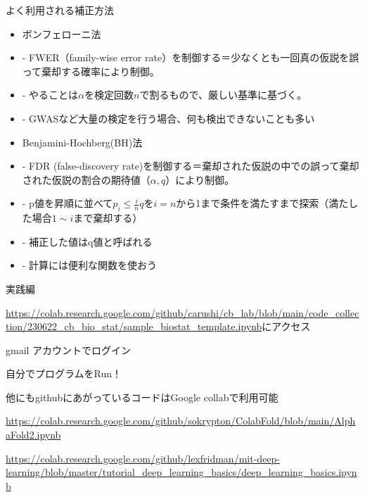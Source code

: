 \documentclass[cjk, aspectratio=169]{beamer}
\begin{document}
    \begin{frame}{よく利用される補正方法}
    \begin{itemize}
        \item ボンフェローニ法
        \item - FWER（family-wise error rate）を制御する＝少なくとも一回真の仮説を誤って棄却する確率により制御。
        \item - やることは$\alpha$を検定回数$n$で割るもので、厳しい基準に基づく。
        \item - GWASなど大量の検定を行う場合、何も検出できないことも多い
        \item Benjamini-Hochberg(BH)法
        \item - FDR (false-discovery rate)を制御する＝棄却された仮説の中での誤って棄却された仮説の割合の期待値（$\alpha,q$）により制御。
        \item - p値を昇順に並べて$p_i \le \frac{i}{n}q$を$i=n$から1まで条件を満たすまで探索（満たした場合$1 \sim i$まで棄却する）
        \item - 補正した値はq値と呼ばれる
        \item - 計算には便利な関数を使おう
    \end{itemize}
    \end{frame}

\begin{frame}{実践編}
\item \url{https://colab.research.google.com/github/carushi/cb_lab/blob/main/code_collection/230622_cb_bio_stat/sample_biostat_template.ipynb}にアクセス
\item gmail アカウントでログイン
\item 自分でプログラムをRun！
\item 他にもgithubにあがっているコードはGoogle collabで利用可能
\item \url{https://colab.research.google.com/github/sokrypton/ColabFold/blob/main/AlphaFold2.ipynb}
\item \url{https://colab.research.google.com/github/lexfridman/mit-deep-learning/blob/master/tutorial_deep_learning_basics/deep_learning_basics.ipynb}
\end{frame}
\end{document}
